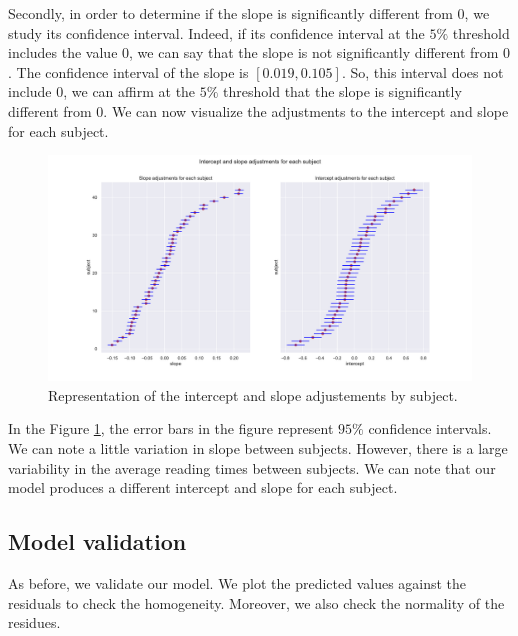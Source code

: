 \documentclass{article}
\begin{document}
Secondly, in order to determine if the slope is significantly different from $0$, we study its confidence interval.
Indeed, if its confidence interval at the $5\%$ threshold includes the value $0$, we can say that the slope is not significantly different from $0$.
The confidence interval of the slope is $[0.019, 0.105]$. So, this interval does not include $0$, we can affirm at the $5\%$ threshold that the slope is significantly different from $0$.
We can now visualize the adjustments to the intercept and slope for each subject.

\begin{figure}[H]
    \centering
    \includegraphics[scale=.42]{./images/model2_inter.pdf}
    \caption{Representation of the intercept and slope adjustements by subject.}
    \label{fig:model2}
\end{figure}

In the Figure \ref{fig:model2}, the error bars in the figure represent $95\%$ confidence intervals. We can note a little variation in slope between subjects. However, there is a large variability in the average reading times between subjects. We can note that our model produces a different intercept and slope for each subject.

\subsection{Model validation}
As before, we validate our model.
We plot the predicted values against the residuals to check the homogeneity. Moreover, we also check the normality of the residues.
\end{document}
